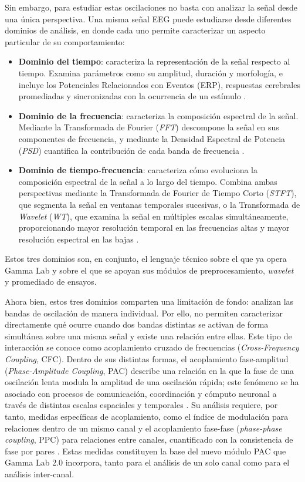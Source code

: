 \documentclass[12pt,letterpaper,oneside]{article}
\begin{document}
Sin embargo, para estudiar estas oscilaciones no basta con analizar la señal desde una única perspectiva. Una misma señal EEG puede estudiarse desde diferentes dominios de análisis, en donde cada uno permite caracterizar un aspecto particular de su comportamiento:

\begin{itemize}
    \item \textbf{Dominio del tiempo}: caracteriza la representación de la señal respecto al tiempo. Examina parámetros como su amplitud, duración y morfología, e incluye los Potenciales Relacionados con Eventos (ERP), respuestas cerebrales promediadas y sincronizadas con la ocurrencia de un estímulo \cite{walla2025}.
    \item \textbf{Dominio de la frecuencia}: caracteriza la composición espectral de la señal. Mediante la Transformada de Fourier (\textit{FFT}) descompone la señal en sus componentes de frecuencia, y mediante la Densidad Espectral de Potencia (\textit{PSD}) cuantifica la contribución de cada banda de frecuencia \cite{singh2023, chaddad2023}.
    \item \textbf{Dominio de tiempo-frecuencia}: caracteriza cómo evoluciona la composición espectral de la señal a lo largo del tiempo. Combina ambas perspectivas mediante la Transformada de Fourier de Tiempo Corto (\textit{STFT}), que segmenta la señal en ventanas temporales sucesivas, o la Transformada de \textit{Wavelet} (\textit{WT}), que examina la señal en múltiples escalas simultáneamente, proporcionando mayor resolución temporal en las frecuencias altas y mayor resolución espectral en las bajas \cite{chaddad2023}.
\end{itemize}

Estos tres dominios son, en conjunto, el lenguaje técnico sobre el que ya opera Gamma Lab y sobre el que se apoyan sus módulos de preprocesamiento, \textit{wavelet} y promediado de ensayos.

Ahora bien, estos tres dominios comparten una limitación de fondo: analizan las bandas de oscilación de manera individual. Por ello, no permiten caracterizar directamente qué ocurre cuando dos bandas distintas se activan de forma simultánea sobre una misma señal y existe una relación entre ellas. Este tipo de interacción se conoce como acoplamiento cruzado de frecuencias (\textit{Cross-Frequency Coupling}, CFC). Dentro de sus distintas formas, el acoplamiento fase-amplitud (\textit{Phase-Amplitude Coupling}, PAC) describe una relación en la que la fase de una oscilación lenta modula la amplitud de una oscilación rápida; este fenómeno se ha asociado con procesos de comunicación, coordinación y cómputo neuronal a través de distintas escalas espaciales y temporales \cite{combrisson2020}. Su análisis requiere, por tanto, medidas específicas de acoplamiento, como el índice de modulación para relaciones dentro de un mismo canal \cite{combrisson2020} y el acoplamiento fase-fase (\textit{phase-phase coupling}, PPC) para relaciones entre canales, cuantificado con la consistencia de fase por pares \cite{vinck2010}. Estas medidas constituyen la base del nuevo módulo PAC que Gamma Lab 2.0 incorpora, tanto para el análisis de un solo canal como para el análisis inter-canal.
\end{document}

